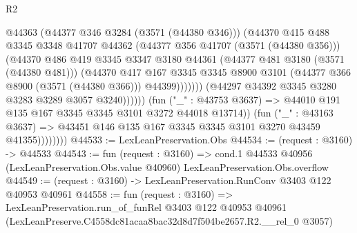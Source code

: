 \begin{lexlean}{R2}
\begin{coremodule}
                                      @44363
                                      (@44377 @346 @3284 (@3571 (@44380 @346)))
                                      (@44370
                                        @415
                                        @488
                                        @3345
                                        @3348
                                        @41707
                                        @44362
                                        (@44377 @356 @41707 (@3571 (@44380 @356)))
                                        (@44370
                                          @486
                                          @419
                                          @3345
                                          @3347
                                          @3180
                                          @44361
                                          (@44377 @481 @3180 (@3571 (@44380 @481)))
                                          (@44370
                                            @417
                                            @167
                                            @3345
                                            @3345
                                            @8900
                                            @3101
                                            (@44377 @366 @8900 (@3571 (@44380 @366)))
                                            @44399)))))))
                              (@44297 @34392 @3345 @3280 @3283 @3289 @3057 @3240))))))
                    (fun ("_" : @43753 @3637) =>
                    @44010 @191 @135 @167 @3345 @3345 @3101 @3272 @44018 @13714))
                  (fun ("_" : @43163 @3637) =>
                  @43451 @146 @135 @167 @3345 @3345 @3101 @3270 @43459 @41355))))))))
@44533 := LexLeanPreservation.Obs
@44534 := (request : @3160) -> @44533
@44543 := fun (request : @3160) =>
  cond.{1} @44533 @40956 (LexLeanPreservation.Obs.value @40960) LexLeanPreservation.Obs.overflow
@44549 := (request : @3160) -> LexLeanPreservation.RunConv @3403 @122 @40953 @40961
@44558 := fun (request : @3160) =>
  LexLeanPreservation.run_of_funRel
    @3403
    @122
    @40953
    @40961
    (LexLeanPreserve.C4558dc81acaa8bac32d8d7f504be2657.R2.__rel_0 @3057)
\end{coremodule}
\end{lexlean}
